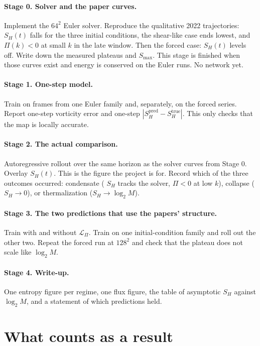\documentclass[11pt,a4paper]{article}
\begin{document}
\paragraph{Stage 0. Solver and the paper curves.}
Implement the \(64^2\) Euler solver. Reproduce the qualitative 2022 trajectories: \(S_H(t)\) falls for the three initial conditions, the shear-like case ends lowest, and \(\Pi(k)<0\) at small \(k\) in the late window.
Then the forced case: \(S_H(t)\) levels off.
Write down the measured plateaus and \(S_{\max}\).
This stage is finished when those curves exist and energy is conserved on the Euler runs.
No network yet.

\paragraph{Stage 1. One-step model.}
Train on frames from one Euler family and, separately, on the forced series.
Report one-step vorticity error and one-step \(|S_H^{\mathrm{pred}}-S_H^{\mathrm{true}}|\).
This only checks that the map is locally accurate.

\paragraph{Stage 2. The actual comparison.}
Autoregressive rollout over the same horizon as the solver curves from Stage 0.
Overlay \(S_H(t)\).
This is the figure the project is for.
Record which of the three outcomes occurred: condensate ( \(S_H\) tracks the solver, \(\Pi<0\) at low \(k\)), collapse (\(S_H\to 0\)), or thermalization (\(S_H\to\log_2 M\)).

\paragraph{Stage 3. The two predictions that use the papers' structure.}
Train with and without \(\mathcal{L}_\Pi\).
Train on one initial-condition family and roll out the other two.
Repeat the forced run at \(128^2\) and check that the plateau does not scale like \(\log_2 M\).

\paragraph{Stage 4. Write-up.}
One entropy figure per regime, one flux figure, the table of asymptotic \(S_H\) against \(\log_2 M\), and a statement of which predictions held.

\section{What counts as a result}
\end{document}
